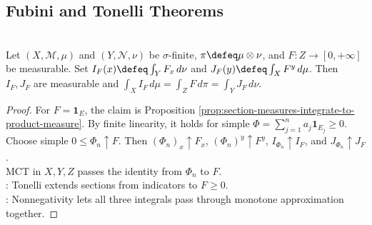 \subsection{Fubini and Tonelli Theorems}

\begin{theorem} \label{thm:tonelli-sigma-finite-product-measures} \\
Let $(X,\mathcal{M},\mu)$ and $(Y,\mathcal{N},\nu)$ be $\sigma$-finite, $\pi\defeq\mu\otimes\nu$, and $F:Z\to[0,+\infty]$ be measurable. Set $I_F(x)\defeq\int_YF_x\,d\nu$ and $J_F(y)\defeq\int_XF^y\,d\mu$. Then $I_F,J_F$ are measurable and $\int_XI_F\,d\mu=\int_ZF\,d\pi=\int_YJ_F\,d\nu$.
\begin{proof}
For $F=\mathbf{1}_E$, the claim is Proposition \ref{prop:section-measures-integrate-to-product-measure}. By finite linearity, it holds for simple $\Phi=\sum_{j=1}^na_j\mathbf{1}_{E_j}\geq0$. Choose simple $0\leq\Phi_n\uparrow F$. Then $(\Phi_n)_x\uparrow F_x$, $(\Phi_n)^y\uparrow F^y$, $I_{\Phi_n}\uparrow I_F$, and $J_{\Phi_n}\uparrow J_F$.\\
MCT in $X,Y,Z$ passes the identity from $\Phi_n$ to $F$.\\
: Tonelli extends sections from indicators to $F\geq0$.\\
: Nonnegativity lets all three integrals pass through monotone approximation together.
\end{proof}
\end{theorem}

